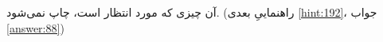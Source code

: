 \section{}
\paragraph{}\label{hint:200}
آن چیزی که مورد انتظار است، چاپ نمی‌شود. (راهنماییِ بعدی \ref{hint:192}، جواب \ref{answer:88})